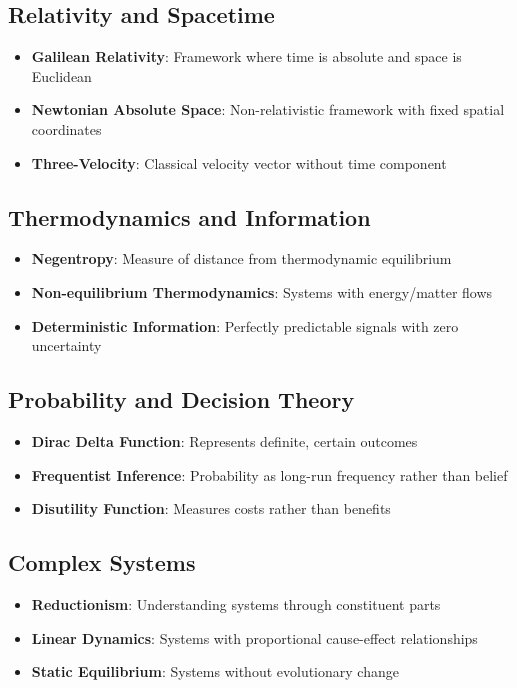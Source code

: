 \documentclass{article}
\begin{document}
\subsection*{Relativity and Spacetime}
\begin{itemize}
\item \textbf{Galilean Relativity}: Framework where time is absolute and space is Euclidean
\item \textbf{Newtonian Absolute Space}: Non-relativistic framework with fixed spatial coordinates
\item \textbf{Three-Velocity}: Classical velocity vector without time component
\end{itemize}

\subsection*{Thermodynamics and Information}
\begin{itemize}
\item \textbf{Negentropy}: Measure of distance from thermodynamic equilibrium
\item \textbf{Non-equilibrium Thermodynamics}: Systems with energy/matter flows
\item \textbf{Deterministic Information}: Perfectly predictable signals with zero uncertainty
\end{itemize}

\subsection*{Probability and Decision Theory}
\begin{itemize}
\item \textbf{Dirac Delta Function}: Represents definite, certain outcomes
\item \textbf{Frequentist Inference}: Probability as long-run frequency rather than belief
\item \textbf{Disutility Function}: Measures costs rather than benefits
\end{itemize}

\subsection*{Complex Systems}
\begin{itemize}
\item \textbf{Reductionism}: Understanding systems through constituent parts
\item \textbf{Linear Dynamics}: Systems with proportional cause-effect relationships
\item \textbf{Static Equilibrium}: Systems without evolutionary change
\end{itemize}
\end{document}
